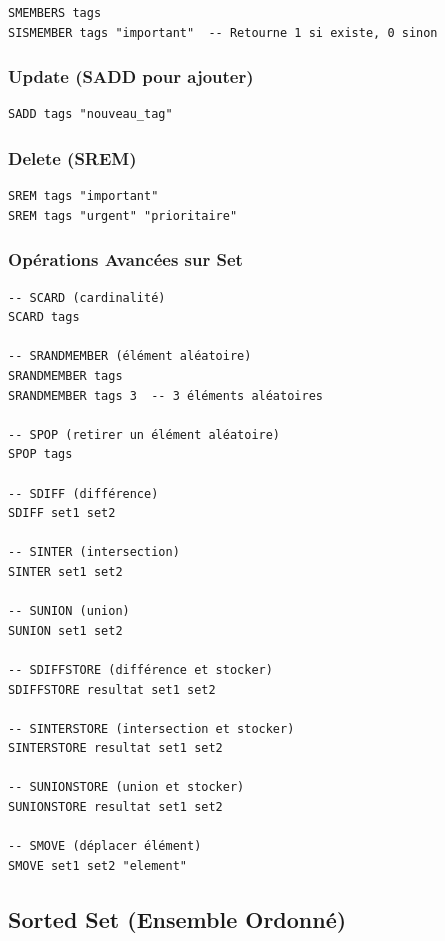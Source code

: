 \documentclass[11pt,a4paper]{article}
\begin{document}
\begin{lstlisting}
SMEMBERS tags
SISMEMBER tags "important"  -- Retourne 1 si existe, 0 sinon
\end{lstlisting}

\subsubsection{Update (SADD pour ajouter)}

\begin{lstlisting}
SADD tags "nouveau_tag"
\end{lstlisting}

\subsubsection{Delete (SREM)}

\begin{lstlisting}
SREM tags "important"
SREM tags "urgent" "prioritaire"
\end{lstlisting}

\subsubsection{Opérations Avancées sur Set}

\begin{lstlisting}
-- SCARD (cardinalité)
SCARD tags

-- SRANDMEMBER (élément aléatoire)
SRANDMEMBER tags
SRANDMEMBER tags 3  -- 3 éléments aléatoires

-- SPOP (retirer un élément aléatoire)
SPOP tags

-- SDIFF (différence)
SDIFF set1 set2

-- SINTER (intersection)
SINTER set1 set2

-- SUNION (union)
SUNION set1 set2

-- SDIFFSTORE (différence et stocker)
SDIFFSTORE resultat set1 set2

-- SINTERSTORE (intersection et stocker)
SINTERSTORE resultat set1 set2

-- SUNIONSTORE (union et stocker)
SUNIONSTORE resultat set1 set2

-- SMOVE (déplacer élément)
SMOVE set1 set2 "element"
\end{lstlisting}

\subsection{Sorted Set (Ensemble Ordonné)}
\end{document}
